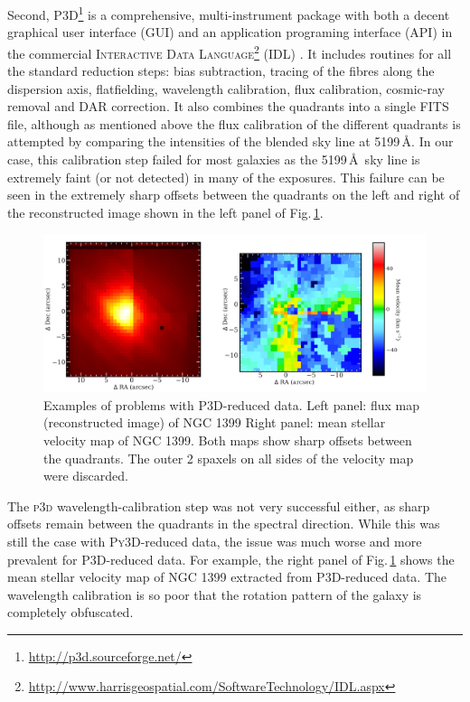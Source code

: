 		Second, \textsc{P3D}\footnote{\url{http://p3d.sourceforge.net/}} is a comprehensive, multi-instrument package with both a decent graphical user interface (GUI) and an application programing interface (API) in the commercial \textsc{Interactive Data Language}\footnote{\url{http://www.harrisgeospatial.com/SoftwareTechnology/IDL.aspx}} (\textsc{IDL}) \citep{Sandin2010, Sandin2011}. It includes routines for all the standard reduction steps: bias subtraction, tracing of the fibres along the dispersion axis, flatfielding, wavelength calibration, flux calibration, cosmic-ray removal and DAR correction. It also combines the quadrants into a single FITS file, although as mentioned above the flux calibration of the different quadrants is attempted by comparing the intensities of the blended sky line at 5199\,\AA. In our case, this calibration step failed for most galaxies as the 5199\,\AA\ sky line is extremely faint (or not detected) in many of the exposures. This failure can be seen in the extremely sharp offsets between the quadrants on the left and right of the reconstructed image shown in the left panel of Fig.\,\ref{fig:P3D}. 

		\begin{figure}
			\centering
			\includegraphics[width=.9\textwidth]{chapter2/P3D_NGC1399.png}
			\caption[\textsc{P3D}-reduced data problems]{Examples of problems with \textsc{P3D}-reduced data. Left panel: flux map (reconstructed image) of NGC 1399 Right panel: mean stellar velocity map of NGC 1399. Both maps show sharp offsets between the quadrants. The outer 2 spaxels on all sides of the velocity map were discarded.}
			\label{fig:P3D}
		\end{figure}


		The \textsc{p3d} wavelength-calibration step was not very successful either, as sharp offsets remain between the quadrants in the spectral direction. While this was still the case with \textsc{Py3D}-reduced data, the issue was much worse and more prevalent for \textsc{P3D}-reduced data. For example, the right panel of Fig.\,\ref{fig:P3D} shows the mean stellar velocity map of NGC 1399 extracted from \textsc{P3D}-reduced data. The wavelength calibration is so poor that the rotation pattern of the galaxy is completely obfuscated.

